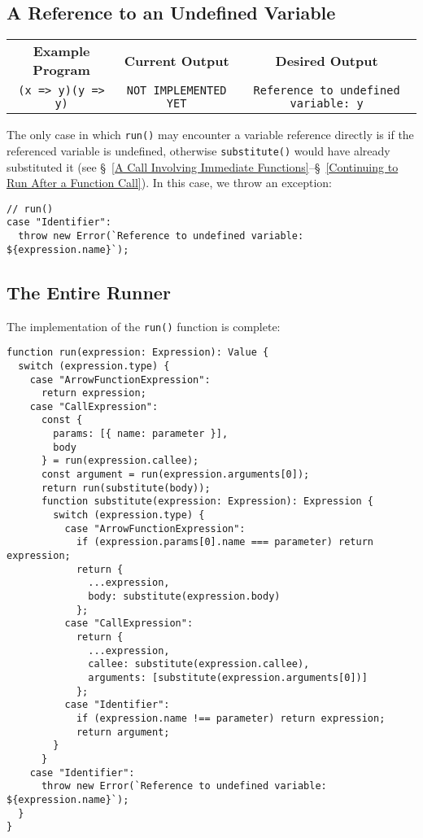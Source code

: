 \documentclass[12pt, oneside]{book}
\begin{document}
\subsection{A Reference to an Undefined Variable}

\begin{center}
\begin{tabular}{c|c|c}
\textbf{Example Program} & \textbf{Current Output} & \textbf{Desired Output} \\
\texttt{(x => y)(y => y)} & \texttt{NOT IMPLEMENTED YET} & \texttt{Reference to undefined variable: y} \\
\end{tabular}
\end{center}

\noindent The only case in which \texttt{run()} may encounter a variable reference directly is if the referenced variable is undefined, otherwise \texttt{substitute()} would have already substituted it (see §~\ref{A Call Involving Immediate Functions}–§~\ref{Continuing to Run After a Function Call}). In this case, we throw an exception:

\begin{verbatim}
// run()
case "Identifier":
  throw new Error(`Reference to undefined variable: ${expression.name}`);
\end{verbatim}


\subsection{The Entire Runner}

The implementation of the \texttt{run()} function is complete:

\begin{verbatim}
function run(expression: Expression): Value {
  switch (expression.type) {
    case "ArrowFunctionExpression":
      return expression;
    case "CallExpression":
      const {
        params: [{ name: parameter }],
        body
      } = run(expression.callee);
      const argument = run(expression.arguments[0]);
      return run(substitute(body));
      function substitute(expression: Expression): Expression {
        switch (expression.type) {
          case "ArrowFunctionExpression":
            if (expression.params[0].name === parameter) return expression;
            return {
              ...expression,
              body: substitute(expression.body)
            };
          case "CallExpression":
            return {
              ...expression,
              callee: substitute(expression.callee),
              arguments: [substitute(expression.arguments[0])]
            };
          case "Identifier":
            if (expression.name !== parameter) return expression;
            return argument;
        }
      }
    case "Identifier":
      throw new Error(`Reference to undefined variable: ${expression.name}`);
  }
}
\end{verbatim}
\end{document}
